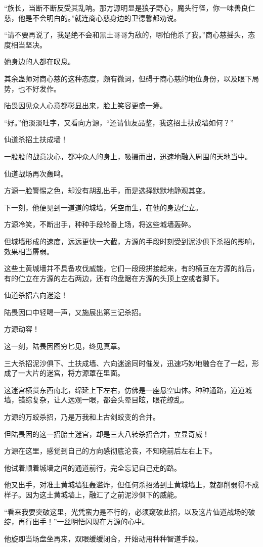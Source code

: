 \begin{this_body}
“族长，当断不断反受其乱呐。那方源明显是狼子野心，魔头行径，你一味善良仁慈，他是不会明白的。”就连商心慈身边的卫德馨都劝说。

“请不要再说了，我是绝不会和黑土哥哥为敌的，哪怕他杀了我。”商心慈摇头，态度相当坚决。

她身边的人都在叹息。

其余蛊师对商心慈的这种态度，颇有微词，但碍于商心慈的地位身份，以及眼下局势，也不好发作。

陆畏因见众人心意都彰显出来，脸上笑容更盛一筹。

“好。”他淡淡吐字，又看向方源，“还请仙友品鉴，我这招土扶成墙如何？”

仙道杀招土扶成墙！

一股股的战意决心，都冲众人的身上，吸摄而出，迅速地融入周围的天地当中。

仙道战场再次轰鸣。

方源一脸警惕之色，却没有胡乱出手，而是选择默默地静观其变。

下一刻，他便见到一道道的城墙，凭空而生，在他的身边伫立。

方源冷笑，不断出手，种种手段轮番上场，将这些城墙轰碎。

但城墙形成的速度，远远更快一大截，方源的手段时刻受到泥沙俱下杀招的影响，效果相当孱弱。

这些土黄城墙并不具备攻伐威能，它们一段段拼接起来，有的横亘在方源的前后，有的伫立在方源的左右两边，还有的盘踞在方源的头顶上空或者脚下。

仙道杀招六向迷途！

陆畏因口中轻喝一声，又施展出第三记杀招。

方源动容！

这一刻，陆畏因图穷匕见，终见真章。

三大杀招泥沙俱下、土扶成墙、六向迷途同时催发，迅速巧妙地融合在了一起，形成了一大片的迷宫，将方源罩在里面。

这迷宫横贯东西南北，绵延上下左右，仿佛是一座悬空山体。种种通路，道道城墙，错综复杂，让人远观一眼，都会头晕目眩，眼花缭乱。

方源的万蛟杀招，乃是万我和上古剑蛟变的合并。

但陆畏因的这一招胎土迷宫，却是三大八转杀招合并，立显奇威！

方源在这里，感觉到自己的方向感彻底沦丧，不知晓前后左右上下。

他试着顺着城墙之间的通道前行，完全忘记自己走的路。

他又出手，对准土黄城墙狂轰滥炸，但任何杀招落到土黄城墙上，就都削弱得不成样子。因为这土黄城墙上，融汇了之前泥沙俱下的威能。

“看来我要突破这里，光凭蛮力是不行的，必须窥破此招，以及这片仙道战场的破绽，再行出手！”一丝明悟闪现在方源的心中。

他旋即当场盘坐再来，双眼缓缓闭合，开始动用种种智道手段。

\end{this_body}


